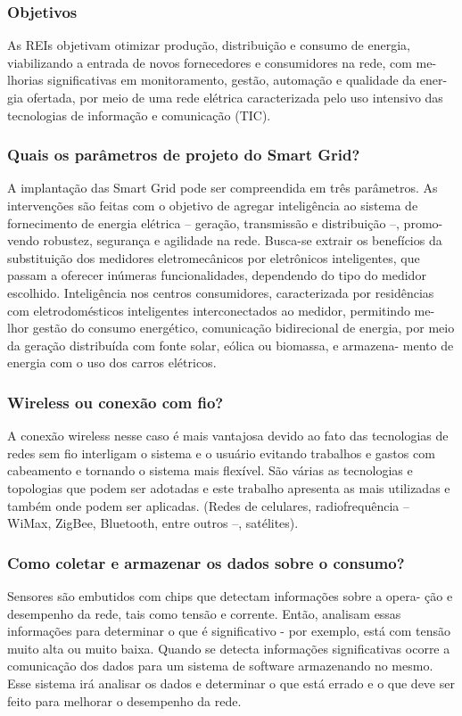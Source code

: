 \subsubsection{Objetivos}

	As REIs objetivam otimizar produção, distribuição e consumo de energia, viabilizando a entrada de novos fornecedores e consumidores na rede, com me- lhorias significativas em monitoramento, gestão, automação e qualidade da ener- gia ofertada, por meio de uma rede elétrica caracterizada pelo uso intensivo das tecnologias de informação e comunicação (TIC).

\subsubsection{Quais os parâmetros de projeto do Smart Grid?}

	A implantação das Smart Grid pode ser compreendida em três parâmetros. As intervenções são feitas com o objetivo de agregar inteligência ao sistema de fornecimento de energia elétrica – geração, transmissão e distribuição –, promo- vendo robustez, segurança e agilidade na rede. Busca-se extrair os benefícios da substituição dos medidores eletromecânicos por eletrônicos inteligentes, que passam a oferecer inúmeras funcionalidades, dependendo do tipo do medidor escolhido. Inteligência nos centros consumidores, caracterizada por residências com eletrodomésticos inteligentes interconectados ao medidor, permitindo me- lhor gestão do consumo energético, comunicação bidirecional de energia, por meio da geração distribuída com fonte solar, eólica ou biomassa, e armazena- mento de energia com o uso dos carros elétricos.

\subsubsection{Wireless ou conexão com fio?}

	A conexão wireless nesse caso é mais vantajosa devido ao fato das tecnologias de redes sem fio interligam o sistema e o usuário evitando trabalhos e gastos com cabeamento e tornando o sistema mais flexível. São várias as tecnologias e topologias que podem ser adotadas e este trabalho apresenta as mais utilizadas e também onde podem ser aplicadas. (Redes de celulares, radiofrequência – WiMax, ZigBee, Bluetooth, entre outros –, satélites).

\subsubsection{Como coletar e armazenar os dados sobre o consumo?}
	
	Sensores são embutidos com chips que detectam informações sobre a opera- ção e desempenho da rede, tais como tensão e corrente. Então, analisam essas informações para determinar o que é significativo - por exemplo, está com tensão muito alta ou muito baixa. Quando se detecta informações significativas ocorre a comunicação dos dados para um sistema de software armazenando no mesmo. Esse sistema irá analisar os dados e determinar o que está errado e o que deve ser feito para melhorar o desempenho da rede.

